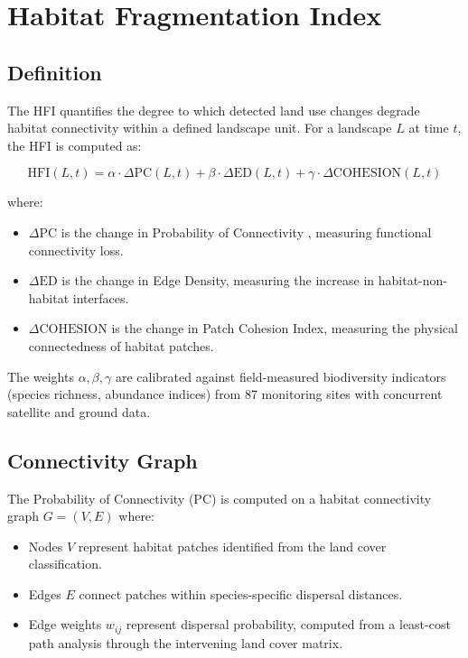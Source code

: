 \section{Habitat Fragmentation Index}

\label{sec:fragmentation}

\subsection{Definition}

The HFI quantifies the degree to which detected land use changes degrade habitat connectivity within a defined landscape unit.
For a landscape $L$ at time $t$, the HFI is computed as:

\begin{equation}
    \text{HFI}(L, t) = \alpha \cdot \Delta\text{PC}(L, t) + \beta \cdot \Delta\text{ED}(L, t) + \gamma \cdot \Delta\text{COHESION}(L, t)
\end{equation}

\noindent where:
\begin{itemize}[leftmargin=*]
    \item $\Delta\text{PC}$ is the change in Probability of Connectivity \citep{saura2007new}, measuring functional connectivity loss.
    \item $\Delta\text{ED}$ is the change in Edge Density, measuring the increase in habitat-non-habitat interfaces.
    \item $\Delta\text{COHESION}$ is the change in Patch Cohesion Index, measuring the physical connectedness of habitat patches.
\end{itemize}

The weights $\alpha, \beta, \gamma$ are calibrated against field-measured biodiversity indicators (species richness, abundance indices) from 87 monitoring sites with concurrent satellite and ground data.

\subsection{Connectivity Graph}

The Probability of Connectivity (PC) is computed on a habitat connectivity graph $G = (V, E)$ where:
\begin{itemize}[leftmargin=*]
    \item Nodes $V$ represent habitat patches identified from the land cover classification.
    \item Edges $E$ connect patches within species-specific dispersal distances.
    \item Edge weights $w_{ij}$ represent dispersal probability, computed from a least-cost path analysis through the intervening land cover matrix.
\end{itemize}

